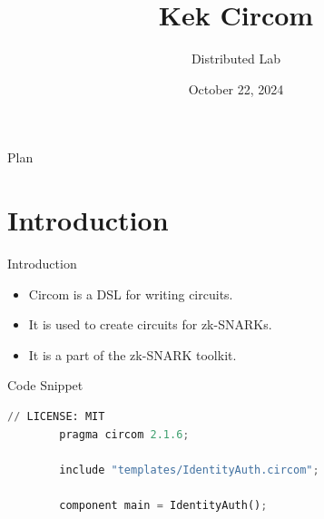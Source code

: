 \documentclass{zkdl-presentation-template}
\title[Circom]{\textbf{Kek Circom}}
\author{Distributed Lab}
\date{October 22, 2024}
\begin{document}

    \begin{frame}{Plan}
        \tableofcontents
    \end{frame}

    \section{Introduction}
    \begin{frame}{Introduction}
        \begin{itemize}
            \item Circom is a DSL for writing circuits.
            \item It is used to create circuits for zk-SNARKs.
            \item It is a part of the zk-SNARK toolkit.
        \end{itemize}
    \end{frame}

    \begin{frame}[fragile]{Code Snippet}
        \begin{lstlisting}[language=Python, numbers=none, autogobble=true, xleftmargin=10pt]
        // LICENSE: MIT
        pragma circom 2.1.6;
        
        include "templates/IdentityAuth.circom";
        
        component main = IdentityAuth();
        \end{lstlisting}
    \end{frame}
\end{document}

